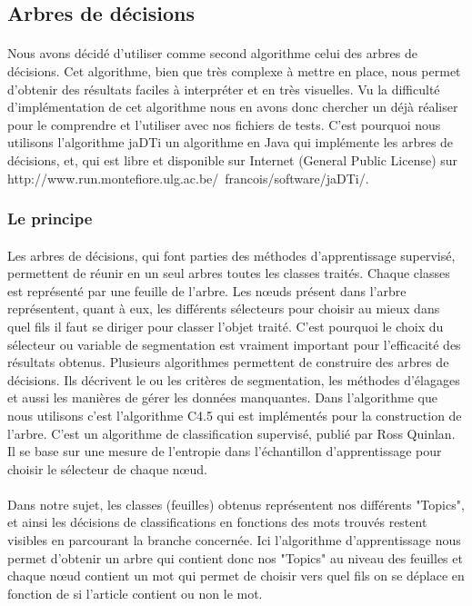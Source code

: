 \subsection{Arbres de décisions}

\paragraph{}
Nous avons décidé d'utiliser comme second algorithme celui des arbres de décisions. Cet algorithme, bien que très complexe à mettre en place, nous permet d'obtenir des résultats faciles à interpréter et en très visuelles.
Vu la difficulté d'implémentation de cet algorithme nous en avons donc chercher un déjà réaliser pour le comprendre et l'utiliser avec nos fichiers de tests. C'est pourquoi nous utilisons l'algorithme jaDTi un algorithme en Java qui implémente les arbres de décisions, et, qui est libre et disponible sur Internet (General Public License) sur http://www.run.montefiore.ulg.ac.be/~francois/software/jaDTi/.


\subsubsection{Le principe}

\paragraph{}
Les arbres de décisions, qui font parties des méthodes d'apprentissage supervisé,  permettent  de réunir en un seul arbres toutes les classes traités. Chaque classes est représenté par une feuille de l'arbre. Les nœuds présent dans l'arbre représentent, quant à eux, les différents sélecteurs pour choisir au mieux dans quel fils il faut se diriger pour classer l'objet traité. C'est pourquoi le choix du sélecteur ou variable de segmentation est vraiment important pour l'efficacité des résultats obtenus.  
Plusieurs algorithmes permettent de construire des arbres de décisions. Ils  décrivent le ou les critères de segmentation, les méthodes d'élagages et aussi  les manières de gérer les données manquantes.
Dans l'algorithme que nous utilisons c'est l'algorithme C4.5 qui est implémentés pour la construction de l'arbre. C'est un algorithme de classification supervisé, publié par Ross Quinlan. Il se base sur une mesure de l'entropie dans l'échantillon d'apprentissage pour choisir le sélecteur de chaque nœud.

\paragraph{}
Dans notre sujet,  les classes (feuilles) obtenus représentent nos différents "Topics",  et ainsi  les décisions de classifications en fonctions des mots trouvés restent visibles en parcourant la branche concernée.
Ici l'algorithme d'apprentissage nous permet d'obtenir un arbre qui contient donc nos "Topics" au niveau des feuilles et chaque nœud contient un mot qui permet de choisir vers quel fils on se déplace en fonction de si l'article contient ou non le mot.  


